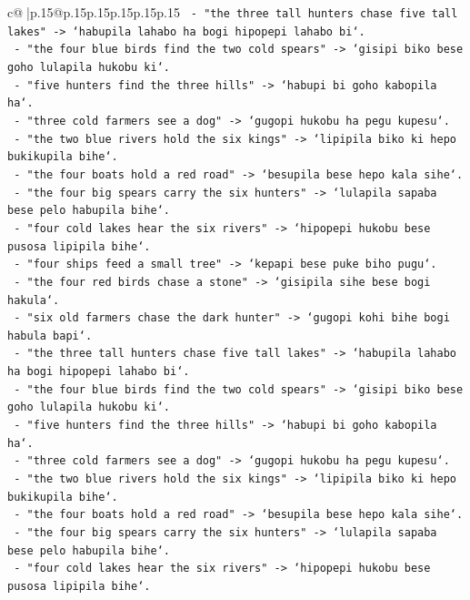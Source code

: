 \documentclass{article}
\begin{document}
{\begin{supertabular}{c@{$\;$}|p{.15\linewidth}@{}p{.15\linewidth}p{.15\linewidth}p{.15\linewidth}p{.15\linewidth}p{.15\linewidth}}
{{{\texttt{  {-} "the three tall hunters chase five tall lakes" {-}> `habupila lahabo ha bogi hipopepi lahabo bi`.} \\
\texttt{  {-} "the four blue birds find the two cold spears" {-}> `gisipi biko bese goho lulapila hukobu ki`.} \\
\texttt{  {-} "five hunters find the three hills" {-}> `habupi bi goho kabopila ha`.} \\
\texttt{  {-} "three cold farmers see a dog" {-}> `gugopi hukobu ha pegu kupesu`.} \\
\texttt{  {-} "the two blue rivers hold the six kings" {-}> `lipipila biko ki hepo bukikupila bihe`.} \\
\texttt{  {-} "the four boats hold a red road" {-}> `besupila bese hepo kala sihe`.} \\
\texttt{  {-} "the four big spears carry the six hunters" {-}> `lulapila sapaba bese pelo habupila bihe`.} \\
\texttt{  {-} "four cold lakes hear the six rivers" {-}> `hipopepi hukobu bese pusosa lipipila bihe`.} \\
\texttt{  {-} "four ships feed a small tree" {-}> `kepapi bese puke biho pugu`.} \\
\texttt{  {-} "the four red birds chase a stone" {-}> `gisipila sihe bese bogi hakula`.} \\
\texttt{  {-} "six old farmers chase the dark hunter" {-}> `gugopi kohi bihe bogi habula bapi`.} \\
\texttt{  {-} "the three tall hunters chase five tall lakes" {-}> `habupila lahabo ha bogi hipopepi lahabo bi`.} \\
\texttt{  {-} "the four blue birds find the two cold spears" {-}> `gisipi biko bese goho lulapila hukobu ki`.} \\
\texttt{  {-} "five hunters find the three hills" {-}> `habupi bi goho kabopila ha`.} \\
\texttt{  {-} "three cold farmers see a dog" {-}> `gugopi hukobu ha pegu kupesu`.} \\
\texttt{  {-} "the two blue rivers hold the six kings" {-}> `lipipila biko ki hepo bukikupila bihe`.} \\
\texttt{  {-} "the four boats hold a red road" {-}> `besupila bese hepo kala sihe`.} \\
\texttt{  {-} "the four big spears carry the six hunters" {-}> `lulapila sapaba bese pelo habupila bihe`.} \\
\texttt{  {-} "four cold lakes hear the six rivers" {-}> `hipopepi hukobu bese pusosa lipipila bihe`.} \\
}}}
\end{supertabular}}
\end{document}

